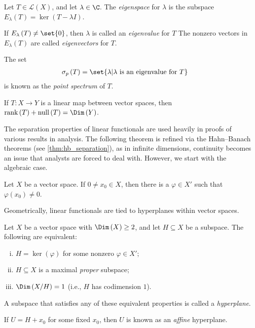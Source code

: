 \begin{definition}\label{def:eigenvalue_eigenspace}
  Let $T\in \mathcal{L}\left(X\right)$, and let $\lambda\in \C$. The \textit{eigenspace} for $\lambda$ is the subspace $E_{\lambda}\left(T\right) = \ker\left(T - \lambda I\right)$.\newline

  If $E_{\lambda}\left(T\right) \neq \set{0}$, then $\lambda$ is called an \textit{eigenvalue} for $T$ The nonzero vectors in $E_{\lambda}\left(T\right)$ are called \textit{eigenvectors} for $T$.\newline

  The set
  \begin{align*}
    \sigma_p\left(T\right) &= \set{\lambda | \lambda\text{ is an eigenvalue for }T}
  \end{align*}
  is known as the \textit{point spectrum} of $T$.
\end{definition}
\begin{theorem}
  If $T\colon X\rightarrow Y$ is a linear map between vector spaces, then $\operatorname{rank}\left(T\right) + \operatorname{null}\left(T\right) = \Dim\left(Y\right)$.
\end{theorem}
The separation properties of linear functionals are used heavily in proofs of various results in analysis. The following theorem is refined via the Hahn--Banach theorems (see \ref{thm:hb_separation}), as in infinite dimensions, continuity becomes an issue that analysts are forced to deal with. However, we start with the algebraic case.
\begin{proposition}
  Let $X$ be a vector space. If $0\neq x_0\in X$, then there is a $\varphi\in X'$ such that $\varphi\left(x_0\right) \neq 0$.
\end{proposition}
Geometrically, linear functionals are tied to hyperplanes within vector spaces.
\begin{proposition}
  Let $X$ be a vector space with $\Dim\left(X\right) \geq 2$, and let $H\subseteq X$ be a subspace. The following are equivalent:
  \begin{enumerate}[(i)]
    \item $H=\ker\left(\varphi\right)$ for some nonzero $\varphi\in X'$;
    \item $H\subseteq X$ is a maximal \textit{proper} subspace;
    \item $\Dim\left(X/H\right) = 1$ (i.e., $H$ has codimension $1$).
  \end{enumerate}
\end{proposition}
\begin{definition}\label{def:hyperplane}
  A subspace that satisfies any of these equivalent properties is called a \textit{hyperplane}.\newline

  If $U = H + x_0$ for some fixed $x_0$, then $U$ is known as an \textit{affine} hyperplane.
\end{definition}

